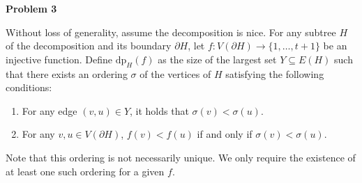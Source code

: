 \documentclass[12pt]{article}
\begin{document}
	\bigskip
	
	\textbf{Problem 3}
	
	\medskip
	
	Without loss of generality, assume the decomposition is nice. For any
	subtree \(H\) of the decomposition and its boundary \(\partial H\), let \(f
	: V(\partial H) \to \{1, \ldots, t + 1\}\) be an injective function. Define
	\(\text{dp}_{H}(f)\) as the size of the largest set \(Y \subseteq E(H)\)
	such that there exists an ordering \(\sigma\) of the vertices of \(H\)
	satisfying the following conditions:
	\begin{enumerate}
		\item For any edge \((v, u) \in Y\), it holds that \(\sigma(v) <
		      \sigma(u)\).
		\item For any \(v, u \in V(\partial H)\), \(f(v) < f(u)\) if and only if
		      \(\sigma(v) < \sigma(u)\).
	\end{enumerate}
	Note that this ordering is not necessarily unique. We only require the
	existence of at least one such ordering for a given \(f\).
	
	\medskip
	
\end{document}
